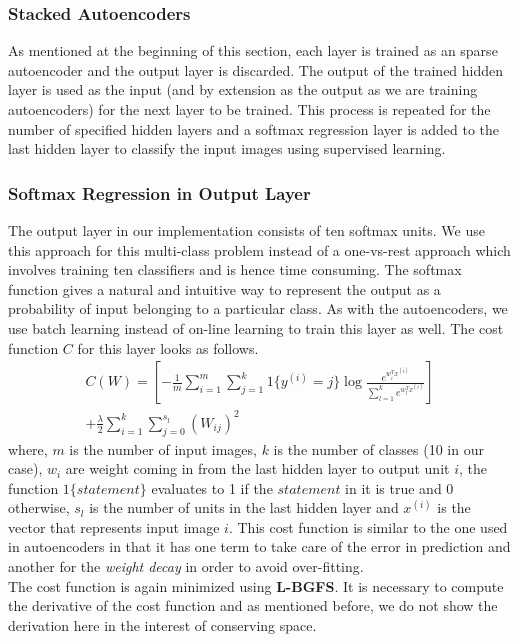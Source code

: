 \documentclass[10pt,twocolumn,letterpaper]{article}
\begin{document}
\subsubsection{Stacked Autoencoders}
As mentioned at the beginning of this section, each layer is trained as an sparse autoencoder and the output layer is discarded. The output of the trained hidden layer is used as the input (and by extension as the output as we are training autoencoders) for the next layer to be trained. This process is repeated for the number of specified hidden layers and a softmax regression layer is added to the last hidden layer to classify the input images using supervised learning.

\subsubsection{Softmax Regression in Output Layer}
The output layer in our implementation consists of ten softmax units. We use this approach for this multi-class problem instead of a one-vs-rest approach which involves training ten classifiers and is hence time consuming. The softmax function gives a natural and intuitive way to represent the output as a probability of input belonging to a particular class. As with the autoencoders, we use batch learning instead of on-line learning to train this layer as well. The cost function $C$ for this layer looks as follows.
\begin{multline*}
C(W) = \left[-\frac{1}{m}\sum\limits_{i=1}^m \sum\limits_{j=1}^k 1\{y^{(i)} = j\} \log \frac{e^{w_i^Tx^{(i)}}}{\sum_{l=1}^{k} e^{w_l^Tx^{(i)}}}\right]\\
+ \frac{\lambda}{2}\sum\limits_{i=1}^k \sum\limits_{j=0}^{s_l} (W_{ij})^2
\end{multline*}
where, $m$ is the number of input images, $k$ is the number of classes (10 in our case), $w_i$ are weight coming in from the last hidden layer to output unit $i$, the function $1\{statement\}$ evaluates to 1 if the $statement$ in it is true and 0 otherwise, $s_l$ is the number of units in the last hidden layer and $x^{(i)}$ is the vector that represents input image $i$. This cost function is similar to the one used in autoencoders in that it has one term to take care of the error in prediction and another for the \textit{weight decay} in order to avoid over-fitting.\\

The cost function is again minimized using \textbf{L-BGFS}. It is necessary to compute the derivative of the cost function and as mentioned before, we do not show the derivation here in the interest of conserving space.
\end{document}
